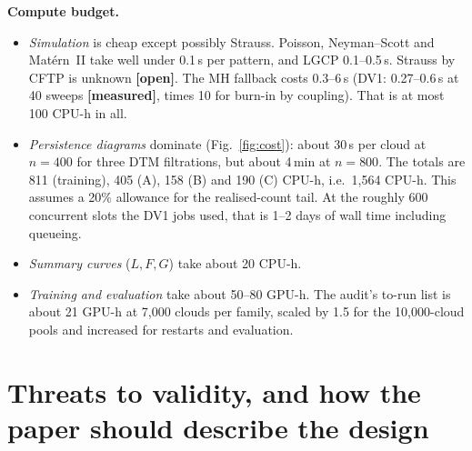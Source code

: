 \documentclass[10pt,a4paper]{article}
\newcommand{\measured}{\textcolor{green!45!black}{\textbf{[measured]}}}
\newcommand{\openflag}{\textcolor{red!65!black}{\textbf{[open]}}}
\begin{document}
\textbf{Compute budget.}
\begin{itemize}
  \item \emph{Simulation} is cheap except possibly Strauss. Poisson, Neyman--Scott and Mat\'ern~II take well under 0.1\,s per pattern, and LGCP 0.1--0.5\,s. Strauss by CFTP is unknown \openflag. The MH fallback costs 0.3--6\,s (DV1: 0.27--0.6\,s at 40 sweeps \measured, times 10 for burn-in by coupling). That is at most 100 CPU-h in all.
  \item \emph{Persistence diagrams} dominate (Fig.~\ref{fig:cost}): about 30\,s per cloud at $n=400$ for three DTM filtrations, but about 4\,min at $n=800$. The totals are 811 (training), 405 (A), 158 (B) and 190 (C) CPU-h, i.e.\ 1{,}564 CPU-h. This assumes a 20\% allowance for the realised-count tail. At the roughly 600 concurrent slots the DV1 jobs used, that is 1--2 days of wall time including queueing.
  \item \emph{Summary curves} ($L,F,G$) take about 20 CPU-h.
  \item \emph{Training and evaluation} take about 50--80 GPU-h. The audit's to-run list is about 21 GPU-h at 7{,}000 clouds per family, scaled by 1.5 for the 10{,}000-cloud pools and increased for restarts and evaluation.
\end{itemize}

\section{Threats to validity, and how the paper should describe the design}\label{sec:threats}
\end{document}
